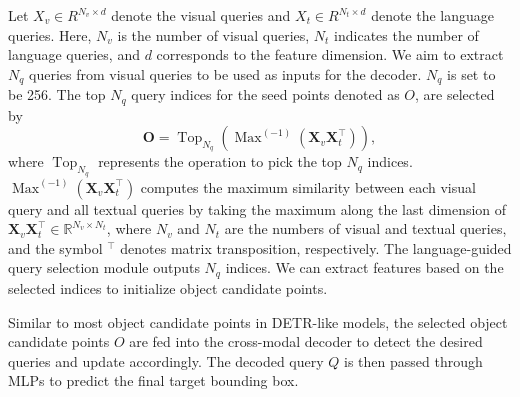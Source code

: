 \documentclass[lettersize,journal]{IEEEtran}
\begin{document}
Let $X_v \in R ^{N_v \times d }$ denote the visual queries and $X_t \in R ^{N_t \times d }$ denote the language queries. Here, $N_v$ is the number of visual queries,  $N_t$  indicates the number of language queries, and $d$ corresponds to the feature dimension. 
We aim to extract $N_q$ queries from visual queries to be used as inputs for the decoder. 
$N_q$ is set to be 256. The top $N_q$ query indices for the seed points denoted as $O$, are selected by
\begin{equation}
\mathbf{O}=\operatorname{Top}_{N_q}(\operatorname{Max}^{(-1)}(\mathbf{X}_{v}\mathbf{X}_{t}^{\top})),
\label{ai:lvis}
\end{equation}
where $\operatorname{Top}_{N_q}$ represents the operation to pick the top $N_q$ indices. 
$\operatorname{Max}^{(-1)}(\mathbf{X}_{v}\mathbf{X}_{t}^{\top})$ computes the maximum similarity between each visual query and all textual queries by taking the maximum along the last dimension of $\mathbf{X}_v \mathbf{X}_t^{\top} \in \mathbb{R}^{N_v \times N_t}$, where $N_v$ and $N_t$ are the numbers of visual and textual queries, and the symbol $^{\top}$ denotes matrix transposition, respectively.
The language-guided query selection module outputs $N_q$ indices. We can extract features based on the selected indices to initialize object candidate points. 

Similar to most object candidate points in DETR-like models\cite{eda}, the selected object candidate points \(O\) are fed into the cross-modal decoder to detect the desired queries and update accordingly. The decoded query \(Q\) is then passed through MLPs to predict the final target bounding box. 


\end{document}
